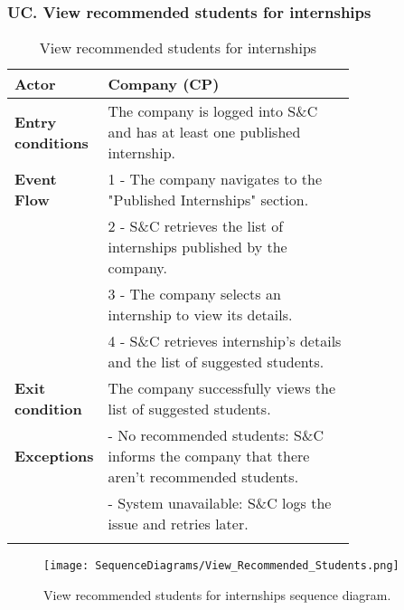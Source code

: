 \subsubsection*{UC\cuc . View recommended students for internships}
\begin{center}
    \begin{longtable}{|l|p{0.75\linewidth}|}
        \hline
        \textbf{Actor}            & Company (CP)\\
        \hline
        \textbf{Entry conditions} & The company is logged into S\&C and has at least one published internship.\\
        \hline
        \textbf{Event Flow}     & 1 - The company navigates to the "Published                              Internships" section. \\
                                & 2 - S\&C retrieves the list of internships published by the company. \\
                                & 3 - The company selects an internship to view its details. \\
                                & 4 - S\&C retrieves internship's details and the list of suggested students.\\
        \hline
        \textbf{Exit condition}     & The company successfully views the list of                                suggested students.\\       
        \hline
        \textbf{Exceptions}     & - No recommended students: S\&C informs the company that there aren't recommended students. \\
                                & - System unavailable: S\&C logs the issue and retries later. \\
        \hline
        \caption{View recommended students for internships}
        \label{tab: view_recommended_students_for_internships_usecase}
    \end{longtable}
\end{center}

\begin{figure}[H]
    \begin{center}
        \texttt{[image: SequenceDiagrams/View\_Recommended\_Students.png]}
        \caption{View recommended students for internships sequence diagram.}
        \label{fig:view_recommended_students_seqd}%
    \end{center}
\end{figure}

